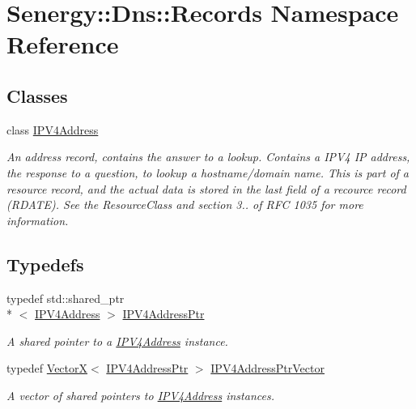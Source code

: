 \hypertarget{namespace_senergy_1_1_dns_1_1_records}{\section{Senergy\-:\-:Dns\-:\-:Records Namespace Reference}
\label{namespace_senergy_1_1_dns_1_1_records}
}
\subsection*{Classes}
\begin{DoxyCompactItemize}
\item 
class \hyperlink{class_senergy_1_1_dns_1_1_records_1_1_i_p_v4_address}{I\-P\-V4\-Address}
\begin{DoxyCompactList}\small\item\em An address record, contains the answer to a lookup. Contains a I\-P\-V4 I\-P address, the response to a question, to lookup a hostname/domain name. This is part of a resource record, and the actual data is stored in the last field of a recource record (R\-D\-A\-T\-E). See the Resource\-Class and section 3.. of R\-F\-C 1035 for more information. \end{DoxyCompactList}\end{DoxyCompactItemize}
\subsection*{Typedefs}
\begin{DoxyCompactItemize}
\item 
typedef std\-::shared\-\_\-ptr\\*
$<$ \hyperlink{class_senergy_1_1_dns_1_1_records_1_1_i_p_v4_address}{I\-P\-V4\-Address} $>$ \hyperlink{namespace_senergy_1_1_dns_1_1_records_a3f0d02fcd6381aee3fab67589ac0890c}{I\-P\-V4\-Address\-Ptr}
\begin{DoxyCompactList}\small\item\em A shared pointer to a \hyperlink{class_senergy_1_1_dns_1_1_records_1_1_i_p_v4_address}{I\-P\-V4\-Address} instance. \end{DoxyCompactList}\item 
typedef \hyperlink{class_senergy_1_1_vector_x}{Vector\-X}$<$ \hyperlink{namespace_senergy_1_1_dns_1_1_records_a3f0d02fcd6381aee3fab67589ac0890c}{I\-P\-V4\-Address\-Ptr} $>$ \hyperlink{namespace_senergy_1_1_dns_1_1_records_a5b9115e6124c4999bbb000e69cfe5d2c}{I\-P\-V4\-Address\-Ptr\-Vector}
\begin{DoxyCompactList}\small\item\em A vector of shared pointers to \hyperlink{class_senergy_1_1_dns_1_1_records_1_1_i_p_v4_address}{I\-P\-V4\-Address} instances. \end{DoxyCompactList}\end{DoxyCompactItemize}



